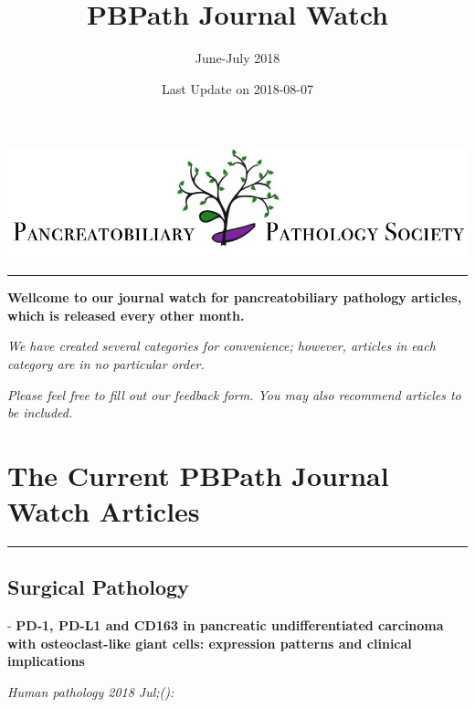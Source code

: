 \documentclass[]{article}
\title{PBPath Journal Watch}
\subtitle{June-July 2018}
\author{}
\date{Last Update on 2018-08-07}
\begin{document}
\maketitle

{
\setcounter{tocdepth}{2}
\tableofcontents
}
\href{http://pbpath.org/}{\includegraphics{figures/PBP_header_logo.jpg}}

\begin{center}\rule{0.5\linewidth}{\linethickness}\end{center}

\textbf{Wellcome to our journal watch for pancreatobiliary pathology
articles, which is released every other month.}

\emph{We have created several categories for convenience; however,
articles in each category are in no particular order.}

\emph{Please feel free to fill out our feedback form. You may also
recommend articles to be included.}

\pagebreak

\hypertarget{the-current-pbpath-journal-watch-articles}{%
\section{The Current PBPath Journal Watch
Articles}\label{the-current-pbpath-journal-watch-articles}}

\begin{center}\rule{0.5\linewidth}{\linethickness}\end{center}

\hypertarget{surgical-pathology}{%
\subsection{Surgical Pathology}\label{surgical-pathology}}

 - \textbf{PD-1, PD-L1 and CD163 in pancreatic undifferentiated
carcinoma with osteoclast-like giant cells: expression patterns and
clinical implications}

\emph{Human pathology 2018 Jul;():}
\end{document}
